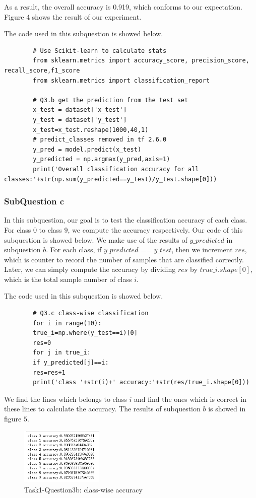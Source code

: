 \documentclass[conference]{IEEEtran}
\begin{document}
	As a result, the overall accuracy is 0.919, which conforms to our expectation. Figure 4 shows the result of our experiment.\par
	
	
	
	The code used in this subquestion is showed below.
	
	\begin{lstlisting}
		# Use Scikit-learn to calculate stats
		from sklearn.metrics import accuracy_score, precision_score, recall_score,f1_score
		from sklearn.metrics import classification_report
		
		# Q3.b get the prediction from the test set
		x_test = dataset['x_test']
		y_test = dataset['y_test']
		x_test=x_test.reshape(1000,40,1)
		# predict_classes removed in tf 2.6.0
		y_pred = model.predict(x_test)
		y_predicted = np.argmax(y_pred,axis=1)
		print('Overall classification accuracy for all classes:'+str(np.sum(y_predicted==y_test)/y_test.shape[0]))
	\end{lstlisting}
	
	
	
	\subsubsection{SubQuestion c}
	In this subquestion, our goal is to test the classification accuracy of each class. For class $0$ to class $9$, we compute the accuracy respectively. Our code of this subquestion is showed below. We make use of the results of $y\_predicted$ in subquestion $b$. For each class, if $y\_predicted$ == $y\_test$, then we increment $res$, which is counter to record the number of samples that are classified correctly. Later, we can simply compute the accuracy by dividing $res$ by $true\_i.shape[0]$, which is the total sample number of class $i$.\par
	The code used in this subquestion is showed below.
	\begin{lstlisting}
		# Q3.c class-wise classification
		for i in range(10):
		true_i=np.where(y_test==i)[0]
		res=0
		for j in true_i:
		if y_predicted[j]==i:
		res=res+1
		print('class '+str(i)+' accuracy:'+str(res/true_i.shape[0]))
	\end{lstlisting} \par 
	We find the lines which belongs to class $i$ and find the ones which is correct in these lines to calculate the accuracy. The results of subquestion $b$ is showed in figure $5$.\par
	\begin{figure}[h] 
		\centering
		\includegraphics[width=0.35\textwidth]{./graphs/T1Q3c.png}
		\caption{Task1-Question3b: class-wise accuracy} 
		\label{Fig.t1q3c} 
	\end{figure}
	
\end{document}
